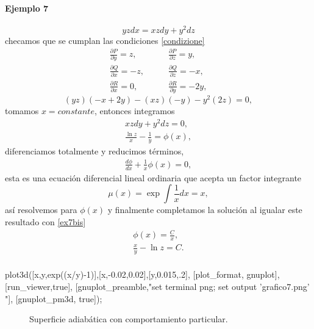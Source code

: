 \documentclass{article}
\theoremstyle{definition} \newtheorem{defi}{Definici\'on}
\theoremstyle{definition} \newtheorem{teo}{Teorema}
\theoremstyle{definition} \newtheorem{cor}{Corolario}
\begin{document}
\paragraph{Ejemplo 7}
\begin{equation}\label{ex7}
yzdx=xzdy+y^2dz
\end{equation}
checamos que se cumplan las condiciones \eqref{condizione}
\begin{align*}
\frac{\partial P}{\partial y} = z, & \qquad \frac{\partial P}{\partial z} = y,\\
\frac{\partial Q}{\partial x} = -z, & \qquad \frac{\partial Q}{\partial z} = -x,\\
\frac{\partial R}{\partial x} = 0, & \qquad \frac{\partial R}{\partial y} = -2y,
\end{align*}
$$(yz)(-x+2y)-(xz)(-y)-y^2(2z)=0,$$
tomamos $x=constante$, entonces integramos
\begin{align}\label{ex7bis}
xzdy+y^2dz = 0,\nonumber\\
\frac{\ln z}{x}-\frac{1}{y} = \phi(x),
\end{align}
diferenciamos totalmente y reducimos t\'erminos,
\begin{align*}
\frac{d\phi}{dx}+\frac{1}{x}\phi(x) =0,
\end{align*}
esta es una ecuaci\'on diferencial lineal ordinaria que acepta un factor integrante 
$$\mu(x)=\exp\int\frac{1}{x}dx=x,$$
as\'i resolvemos para $\phi(x)$ y finalmente completamos la soluci\'on al igualar este resultado con \eqref{ex7bis}
\begin{align*}
\phi(x) = \frac{C}{x},\\
\frac{x}{y}-\ln z = C.\\
\end{align*}
\begin{maximacmd}
   plot3d([x,y,exp((x/y)-1)],[x,-0.02,0.02],[y,0.015,.2],
    [plot_format, gnuplot],
    [run_viewer,true],
    [gnuplot_preamble,"set terminal png; set output 'grafico7.png' "],
    [gnuplot_pm3d, true]);
\end{maximacmd}
\begin{figure}
\caption{Superficie adiab\'atica con comportamiento particular.}
\end{figure}
\end{document}
